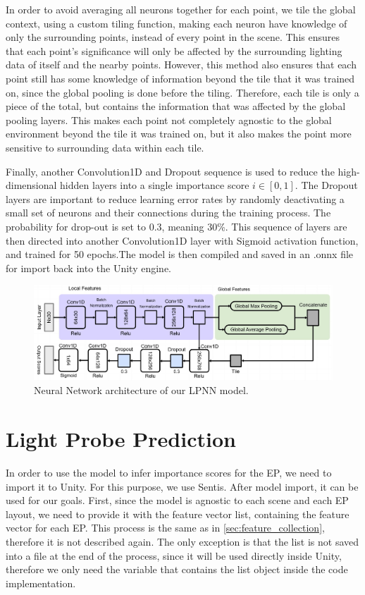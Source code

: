 In order to avoid averaging all neurons together for each point, we tile the global context, using a custom tiling function, making each neuron have knowledge of only the surrounding points, instead of every point in the scene. This ensures that each point's significance will only be affected by the surrounding lighting data of itself and the nearby points. However, this method also ensures that each point still has some knowledge of information beyond the tile that it was trained on, since the global pooling is done before the tiling. Therefore, each tile is only a piece of the total, but contains the information that was affected by the global pooling layers. This makes each point not completely agnostic to the global environment beyond the tile it was trained on, but it also makes the point more sensitive to surrounding data within each tile.

Finally, another Convolution1D and Dropout sequence is used to reduce the high-dimensional hidden layers into a single importance score $i \in [0,1]$. The Dropout layers are important to reduce learning error rates by randomly deactivating a small set of neurons and their connections during the training process. The probability for drop-out is set to 0.3, meaning 30\%. This sequence of layers are then directed into another Convolution1D layer with Sigmoid activation function, and trained for 50 epochs.The model is then compiled and saved in an .onnx file for import back into the Unity engine.

\begin{figure}[h]
	\centering
	\includegraphics[scale=0.392]{Graphics/LPNN.jpg}
	\caption{Neural Network architecture of our LPNN model.}
	\label{fig:LPNN_arch}
\end{figure}

\section{Light Probe Prediction}
In order to use the model to infer importance scores for the EP, we need to import it to Unity. For this purpose, we use Sentis. After model import, it can be used for our goals. First, since the model is agnostic to each scene and each EP layout, we need to provide it with the feature vector list, containing the feature vector for each EP. This process is the same as in \ref{sec:feature_collection}, therefore it is not described again. The only exception is that the list is not saved into a file at the end of the process, since it will be used directly inside Unity, therefore we only need the variable that contains the list object inside the code implementation.

